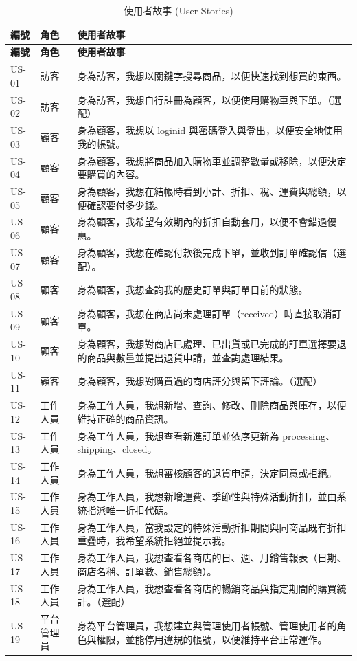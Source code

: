 \documentclass[12pt,a4paper]{article}
\begin{document}
\begin{xltabular}{\linewidth}{|>{\centering\arraybackslash}p{1.4cm}|>{\centering\arraybackslash}p{1.8cm}|X|}
\caption{使用者故事 (User Stories)}\\
\hline{}\textbf{編號} & \textbf{角色} & \textbf{使用者故事}\\\hline\endfirsthead
\hline{}\textbf{編號} & \textbf{角色} & \textbf{使用者故事}\\\hline\endhead
US-01 & 訪客 & 身為訪客，我想以關鍵字搜尋商品，以便快速找到想買的東西。\\\hline
US-02 & 訪客 & 身為訪客，我想自行註冊為顧客，以便使用購物車與下單。（選配）\\\hline
US-03 & 顧客 & 身為顧客，我想以 loginid 與密碼登入與登出，以便安全地使用我的帳號。\\\hline
US-04 & 顧客 & 身為顧客，我想將商品加入購物車並調整數量或移除，以便決定要購買的內容。\\\hline
US-05 & 顧客 & 身為顧客，我想在結帳時看到小計、折扣、稅、運費與總額，以便確認要付多少錢。\\\hline
US-06 & 顧客 & 身為顧客，我希望有效期內的折扣自動套用，以便不會錯過優惠。\\\hline
US-07 & 顧客 & 身為顧客，我想在確認付款後完成下單，並收到訂單確認信（選配）。\\\hline
US-08 & 顧客 & 身為顧客，我想查詢我的歷史訂單與訂單目前的狀態。\\\hline
US-09 & 顧客 & 身為顧客，我想在商店尚未處理訂單（received）時直接取消訂單。\\\hline
US-10 & 顧客 & 身為顧客，我想對商店已處理、已出貨或已完成的訂單選擇要退的商品與數量並提出退貨申請，並查詢處理結果。\\\hline
US-11 & 顧客 & 身為顧客，我想對購買過的商店評分與留下評論。（選配）\\\hline
US-12 & 工作人員 & 身為工作人員，我想新增、查詢、修改、刪除商品與庫存，以便維持正確的商品資訊。\\\hline
US-13 & 工作人員 & 身為工作人員，我想查看新進訂單並依序更新為 processing、shipping、closed。\\\hline
US-14 & 工作人員 & 身為工作人員，我想審核顧客的退貨申請，決定同意或拒絕。\\\hline
US-15 & 工作人員 & 身為工作人員，我想新增運費、季節性與特殊活動折扣，並由系統指派唯一折扣代碼。\\\hline
US-16 & 工作人員 & 身為工作人員，當我設定的特殊活動折扣期間與同商品既有折扣重疊時，我希望系統拒絕並提示我。\\\hline
US-17 & 工作人員 & 身為工作人員，我想查看各商店的日、週、月銷售報表（日期、商店名稱、訂單數、銷售總額）。\\\hline
US-18 & 工作人員 & 身為工作人員，我想查看各商店的暢銷商品與指定期間的購買統計。（選配）\\\hline
US-19 & 平台管理員 & 身為平台管理員，我想建立與管理使用者帳號、管理使用者的角色與權限，並能停用違規的帳號，以便維持平台正常運作。\\\hline
\end{xltabular}
\end{document}
